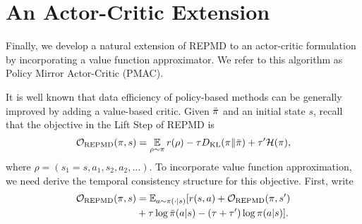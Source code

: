 


\section{An Actor-Critic Extension}
\label{subsec:repmd_value}

\newcommand{\parV}{V_{\phi}}
\newcommand{\parTargetV}{V_{\bar{\phi}}}
\newcommand{\parQ}{Q_{\psi}}
\newcommand{\parPi}{\pi_{\theta}}
\newcommand{\parQone}{Q_{\psi_1}}
\newcommand{\parQtwo}{Q_{\psi_2}}


Finally, we develop a natural extension of REPMD to an actor-critic
formulation by incorporating a value function approximator.
We refer to this algorithm as Policy Mirror Actor-Critic (PMAC). 

It is well known that data efficiency of policy-based methods 
can be generally improved by adding a value-based critic.
Given $\bar{\pi}$ and an initial state $s$,
recall that the objective in the Lift Step of REPMD is
{\small
\begin{equation*}
	{\mathcal{O}}_{\text{REPMD}}(\pi, s) =   \operatorname*{\mathbb{E}}\limits_{\rho \sim \pi}{  r(\rho)  - \tau D_{\mathrm{KL}}(\pi \| \bar{\pi}) + \tau^{\prime} \mathcal{H}(\pi)},
\end{equation*}
}
where $\rho=  (s_1 = s, a_1, s_2, a_2, \ldots)$.
To incorporate value function approximation, we need derive 
the temporal consistency structure for this objective.
First, write
{\small
\begin{equation*}
\begin{split}
 {\mathcal{O}}_{\text{REPMD}}(\pi, s) &= \mathbb{E}_{a\sim \pi(\cdot \vert s)} [ r(s,a) + {\mathcal{O}}_{\text{REPMD}}(\pi, s') \\
 &+ \tau \log \bar{\pi}(a|s) - \left(\tau+ \tau' \right) \log \pi(a|s) ].
\end{split}
\end{equation*}
}

